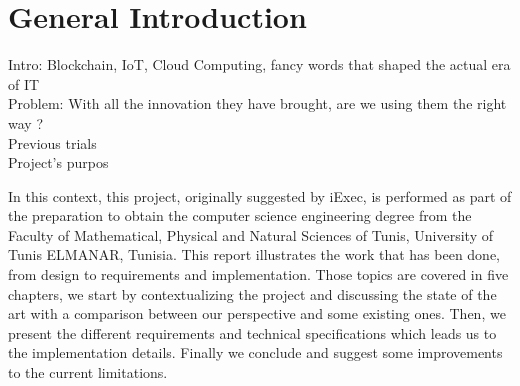 
\chapter{General Introduction}

\ifpdf
    \graphicspath{{figs/Raster/}{figs/PDF/}{figs/}}
\else
    \graphicspath{{figs/Vector/}{figs/}}
\fi



Intro: Blockchain, IoT, Cloud Computing, fancy words that shaped the actual era of IT\\
Problem: With all the innovation they have brought, are we using them the right way ?\\
Previous trials\\
Project's purpos

In this context, this project, originally suggested by iExec, is performed as part of the
preparation to obtain the computer science engineering degree from the Faculty of Mathematical,
Physical and Natural Sciences of Tunis, University of Tunis ELMANAR, Tunisia. This report illustrates
the work that has been done, from design to requirements and implementation. Those topics are covered
in five chapters, we start by contextualizing the project and discussing the state of the art with
a comparison between our perspective and some existing ones. Then, we present the different requirements
and technical specifications which leads us to the implementation details. Finally we conclude and
suggest some improvements to the current limitations.